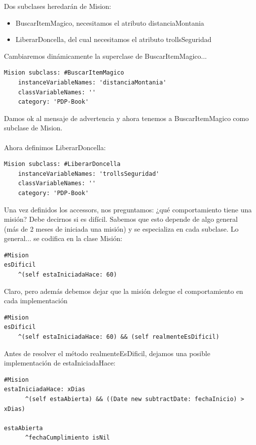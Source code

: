 \documentclass[a4paper,12pt]{book}
\begin{document}
Dos subclases heredarán de Mision: 

\begin{itemize}
 \item BuscarItemMagico, necesitamos el atributo distanciaMontania
 \item LiberarDoncella, del cual necesitamos el atributo trollsSeguridad
\end{itemize}

Cambiaremos dinámicamente la superclase de BuscarItemMagico...

\begin{lstlisting}[frame=single]
Mision subclass: #BuscarItemMagico
	instanceVariableNames: 'distanciaMontania'
	classVariableNames: ''
	category: 'PDP-Book'
\end{lstlisting}

Damos ok al mensaje de advertencia y ahora tenemos a BuscarItemMagico como subclase de Mision.
\\
\\
Ahora definimos LiberarDoncella:

\begin{lstlisting}[frame=single]
Mision subclass: #LiberarDoncella
	instanceVariableNames: 'trollsSeguridad'
	classVariableNames: ''
	category: 'PDP-Book'
\end{lstlisting}

Una vez definidos los accessors, nos preguntamos: ¿qué comportamiento tiene una misión? Debe decirnos
si es difícil. Sabemos que esto depende de algo general (más de 2 meses de iniciada una misión) y se
especializa en cada subclase. Lo general... se codifica en la clase Misión:

\begin{lstlisting}[frame=single]
#Mision
esDificil
	^(self estaIniciadaHace: 60)
\end{lstlisting}

Claro, pero además debemos dejar que la misión delegue el comportamiento en cada implementación
\begin{lstlisting}[frame=single]
#Mision
esDificil
	^(self estaIniciadaHace: 60) && (self realmenteEsDificil)
\end{lstlisting}

Antes de resolver el método realmenteEsDificil, dejamos una posible implementación de estaIniciadaHace:

\begin{lstlisting}[frame=single]
#Mision
estaIniciadaHace: xDias
      ^(self estaAbierta) && ((Date new subtractDate: fechaInicio) > xDias)
      
estaAbierta
      ^fechaCumplimiento isNil       
\end{lstlisting}
\end{document}
